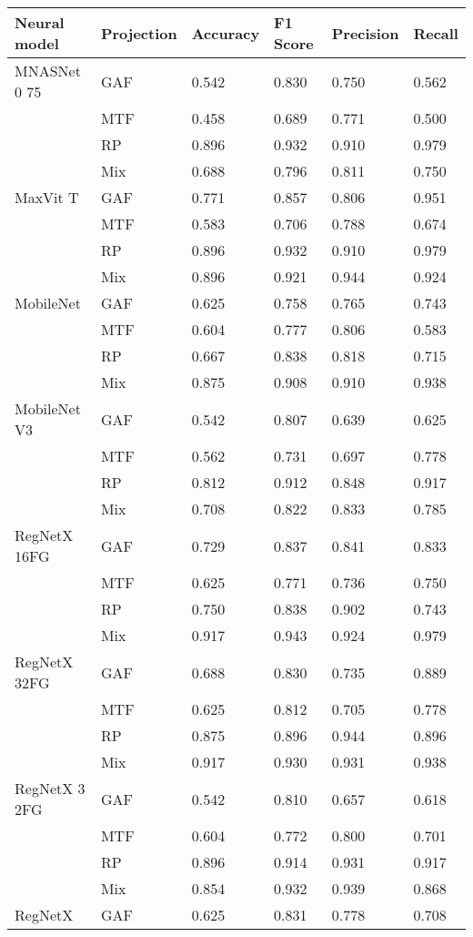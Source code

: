 
\begin{tabular}[t]{llllll}
\toprule
Neural model & Projection & Accuracy & F1 Score & Precision & Recall \\
\midrule
MNASNet 0 75 & GAF & 0.542 & 0.830 & 0.750 & 0.562 \\
 & MTF & 0.458 & 0.689 & 0.771 & 0.500 \\
 & RP & 0.896 & 0.932 & 0.910 & 0.979 \\
 & Mix & 0.688 & 0.796 & 0.811 & 0.750 \\
MaxVit T & GAF & 0.771 & 0.857 & 0.806 & 0.951 \\
 & MTF & 0.583 & 0.706 & 0.788 & 0.674 \\
 & RP & 0.896 & 0.932 & 0.910 & 0.979 \\
 & Mix & 0.896 & 0.921 & 0.944 & 0.924 \\
MobileNet & GAF & 0.625 & 0.758 & 0.765 & 0.743 \\
 & MTF & 0.604 & 0.777 & 0.806 & 0.583 \\
 & RP & 0.667 & 0.838 & 0.818 & 0.715 \\
 & Mix & 0.875 & 0.908 & 0.910 & 0.938 \\
MobileNet V3 & GAF & 0.542 & 0.807 & 0.639 & 0.625 \\
 & MTF & 0.562 & 0.731 & 0.697 & 0.778 \\
 & RP & 0.812 & 0.912 & 0.848 & 0.917 \\
 & Mix & 0.708 & 0.822 & 0.833 & 0.785 \\
RegNetX 16FG & GAF & 0.729 & 0.837 & 0.841 & 0.833 \\
 & MTF & 0.625 & 0.771 & 0.736 & 0.750 \\
 & RP & 0.750 & 0.838 & 0.902 & 0.743 \\
 & Mix & 0.917 & 0.943 & 0.924 & 0.979 \\
RegNetX 32FG & GAF & 0.688 & 0.830 & 0.735 & 0.889 \\
 & MTF & 0.625 & 0.812 & 0.705 & 0.778 \\
 & RP & 0.875 & 0.896 & 0.944 & 0.896 \\
 & Mix & 0.917 & 0.930 & 0.931 & 0.938 \\
RegNetX 3 2FG & GAF & 0.542 & 0.810 & 0.657 & 0.618 \\
 & MTF & 0.604 & 0.772 & 0.800 & 0.701 \\
 & RP & 0.896 & 0.914 & 0.931 & 0.917 \\
 & Mix & 0.854 & 0.932 & 0.939 & 0.868 \\
RegNetX & GAF & 0.625 & 0.831 & 0.778 & 0.708 \\

\end{tabular}
